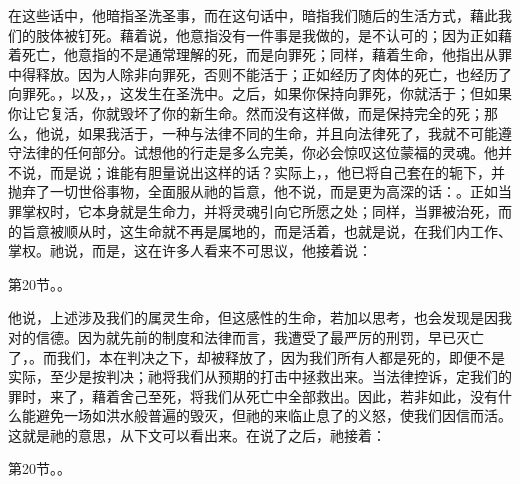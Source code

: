 在这些话中，他暗指圣洗圣事，而在这句话中，暗指我们随后的生活方式，藉此我们的肢体被钉死。藉着说，他意指没有一件事是我做的，是不认可的；因为正如藉着死亡，他意指的不是通常理解的死，而是向罪死；同样，藉着生命，他指出从罪中得释放。因为人除非向罪死，否则不能活于；正如经历了肉体的死亡，也经历了向罪死。，以及，，这发生在圣洗中。之后，如果你保持向罪死，你就活于；但如果你让它复活，你就毁坏了你的新生命。然而没有这样做，而是保持完全的死；那么，他说，如果我活于，一种与法律不同的生命，并且向法律死了，我就不可能遵守法律的任何部分。试想他的行走是多么完美，你必会惊叹这位蒙福的灵魂。他并不说，而是说；谁能有胆量说出这样的话？实际上，，他已将自己套在的轭下，并抛弃了一切世俗事物，全面服从祂的旨意，他不说，而是更为高深的话：。正如当罪掌权时，它本身就是生命力，并将灵魂引向它所愿之处；同样，当罪被治死，而的旨意被顺从时，这生命就不再是属地的，而是活着，也就是说，在我们内工作、掌权。祂说，而是，这在许多人看来不可思议，他接着说：\par

第20节。。\par

他说，上述涉及我们的属灵生命，但这感性的生命，若加以思考，也会发现是因我对的信德。因为就先前的制度和法律而言，我遭受了最严厉的刑罚，早已灭亡了，。而我们，本在判决之下，却被释放了，因为我们所有人都是死的，即便不是实际，至少是按判决；祂将我们从预期的打击中拯救出来。当法律控诉，定我们的罪时，来了，藉着舍己至死，将我们从死亡中全部救出。因此，若非如此，没有什么能避免一场如洪水般普遍的毁灭，但祂的来临止息了的义怒，使我们因信而活。这就是祂的意思，从下文可以看出来。在说了之后，祂接着：\par

第20节。。\par

